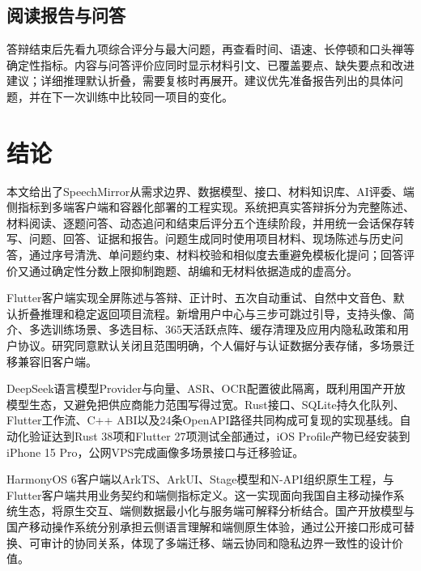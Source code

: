 \section{阅读报告与问答}
答辩结束后先看九项综合评分与最大问题，再查看时间、语速、长停顿和口头禅等确定性指标。内容与问答评价应同时显示材料引文、已覆盖要点、缺失要点和改进建议；详细推理默认折叠，需要复核时再展开。建议优先准备报告列出的具体问题，并在下一次训练中比较同一项目的变化。

\chapter{结论}
本文给出了SpeechMirror从需求边界、数据模型、接口、材料知识库、AI评委、端侧指标到多端客户端和容器化部署的工程实现。系统把真实答辩拆分为完整陈述、材料阅读、逐题问答、动态追问和结束后评分五个连续阶段，并用统一会话保存转写、问题、回答、证据和报告。问题生成同时使用项目材料、现场陈述与历史问答，通过序号清洗、单问题约束、材料校验和相似度去重避免模板化提问；回答评价又通过确定性分数上限抑制跑题、胡编和无材料依据造成的虚高分。

Flutter客户端实现全屏陈述与答辩、正计时、五次自动重试、自然中文音色、默认折叠推理和稳定返回项目流程。新增用户中心与三步可跳过引导，支持头像、简介、多选训练场景、多选目标、365天活跃点阵、缓存清理及应用内隐私政策和用户协议。研究同意默认关闭且范围明确，个人偏好与认证数据分表存储，多场景迁移兼容旧客户端。

DeepSeek语言模型Provider与向量、ASR、OCR配置彼此隔离，既利用国产开放模型生态，又避免把供应商能力范围写得过宽。Rust接口、SQLite持久化队列、Flutter工作流、C++ ABI以及24条OpenAPI路径共同构成可复现的实现基线。自动化验证达到Rust 38项和Flutter 27项测试全部通过，iOS Profile产物已经安装到iPhone 15 Pro，公网VPS完成画像多场景接口与迁移验证。

HarmonyOS 6客户端以ArkTS、ArkUI、Stage模型和N-API组织原生工程，与Flutter客户端共用业务契约和端侧指标定义。这一实现面向我国自主移动操作系统生态，将原生交互、端侧数据最小化与服务端可解释分析结合。国产开放模型与国产移动操作系统分别承担云侧语言理解和端侧原生体验，通过公开接口形成可替换、可审计的协同关系，体现了多端迁移、端云协同和隐私边界一致性的设计价值。
